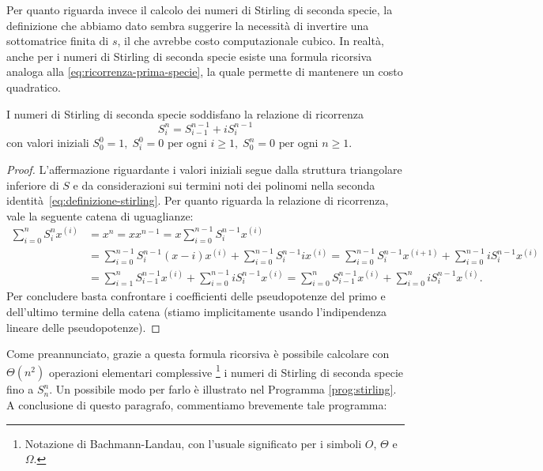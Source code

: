Per quanto riguarda invece il calcolo dei numeri di Stirling di seconda specie,
la definizione che abbiamo dato sembra suggerire la necessità di
invertire una sottomatrice finita di $s$,
il che avrebbe costo computazionale cubico.
In realtà, anche per i numeri di Stirling di seconda specie esiste
una formula ricorsiva analoga alla \eqref{eq:ricorrenza-prima-specie},
la quale permette di mantenere un costo quadratico.
\begin{teor}
I numeri di Stirling di seconda specie soddisfano la relazione di ricorrenza
\begin{equation} \label{eq:ricorrenza-seconda-specie}
S_i^n = S_{i-1}^{n-1} + i S_i^{n-1}
\end{equation}
con valori iniziali $S_0^0 = 1,
\; S_i^0 = 0 \text{ per ogni $i \geq 1$},
\; S_0^n = 0 \text{ per ogni $n \geq 1$.}$
\end{teor}

\begin{proof}
L'affermazione riguardante i valori iniziali segue dalla
struttura triangolare inferiore di $S$ e da considerazioni sui termini
noti dei polinomi nella seconda identità~\eqref{eq:definizione-stirling}.
Per quanto riguarda la relazione di ricorrenza,
vale la seguente catena di uguaglianze:
\begin{align*}
\sum_{i=0}^{n} S_i^n x^{(i)}
&= x^n
 = x x^{n-1}
 = x \sum_{i=0}^{n-1} S_i^{n-1} x^{(i)} \\
&= \sum_{i=0}^{n-1} S_i^{n-1} (x-i) x^{(i)}
	+ \sum_{i=0}^{n-1} S_i^{n-1} i x^{(i)}
 = \sum_{i=0}^{n-1} S_i^{n-1} x^{(i+1)}
	+ \sum_{i=0}^{n-1} i S_i^{n-1} x^{(i)} \\
&= \sum_{i=1}^{n} S_{i-1}^{n-1} x^{(i)}
	+ \sum_{i=0}^{n-1} i S_i^{n-1} x^{(i)}
 = \sum_{i=0}^{n} S_{i-1}^{n-1} x^{(i)}
	+ \sum_{i=0}^{n} i S_i^{n-1} x^{(i)}.
\end{align*}
Per concludere basta confrontare i coefficienti delle pseudopotenze
del primo e dell'ultimo termine della catena (stiamo implicitamente
usando l'indipendenza lineare delle pseudopotenze).
\end{proof}

Come preannunciato, grazie a questa formula ricorsiva è possibile
calcolare con $\Theta(n^2)$ operazioni elementari complessive%
\footnote{Notazione di Bachmann-Landau, con l'usuale significato
per i simboli $O$, $\Theta$ e $\Omega$.}
i numeri di Stirling di seconda specie fino a $S_n^n$.
Un possibile modo per farlo è illustrato nel Programma \ref{prog:stirling}.
A conclusione di questo paragrafo, commentiamo brevemente tale programma:

